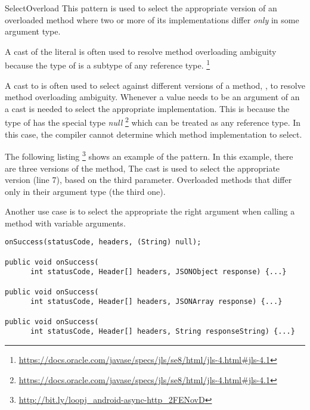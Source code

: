 \begin{pattern}{SelectOverload}
This pattern is used to select the appropriate version of an overloaded method%
where two or more of its implementations differ \emph{only} in some argument type.

A cast of the   literal is often used to 
  resolve method overloading ambiguity because the type of  
  is a subtype of any reference type.%
\footnote{\url{https://docs.oracle.com/javase/specs/jls/se8/html/jls-4.html\#jls-4.1}}


A cast to  is often used to select against different versions
of a method, \ie{}, to resolve method overloading ambiguity.
Whenever a  value needs to be an argument of an a cast is
needed to select the appropriate implementation.
This is because the type of  has the special type \emph{null}%
\footnote{\url{https://docs.oracle.com/javase/specs/jls/se8/html/jls-4.html\#jls-4.1}}
which can be treated as any reference type.
In this case,
the compiler cannot determine which method implementation to select.




\instances{}
The following listing%
\footnote{\url{http://bit.ly/loopj_android-async-http_2FENovD}}
shows an example of the \thisp{} pattern.
In this example, there are three versions of the  method,
The cast  is used to select the appropriate version
(line 7), based on the third parameter.
Overloaded methods that differ only in their argument type (the third one).

Another use case is to select the appropriate the right argument when
calling a method with variable arguments.

\begin{verbatim}
onSuccess(statusCode, headers, (String) null);

public void onSuccess(
      int statusCode, Header[] headers, JSONObject response) {...}

public void onSuccess(
      int statusCode, Header[] headers, JSONArray response) {...}

public void onSuccess(
      int statusCode, Header[] headers, String responseString) {...}
\end{verbatim}


\end{pattern}
